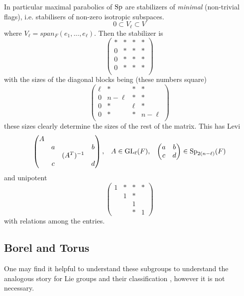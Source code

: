     \label{maximal_parabolic}
    In particular maximal parabolics of \(\operatorname{Sp}\) are stabilizers of \textit{minimal} (non-trivial flags), i.e. stabilisers of non-zero isotropic subspaces.
    \[0 \subset V_\ell \subset V\]
    where \(V_\ell = span_F(e_1, ..., e_\ell)\). Then the stabilizer is 
    \[\begin{pmatrix}
        * &*&*&* \\
        0 &*&*&* \\
        0 &*&*&* \\
        0 &*&*&* \\
    \end{pmatrix}\]
    with the sizes of the diagonal blocks being (these numbers square)
    \[\begin{pmatrix}
        \ell &*&*&* \\
        0 &n-\ell&*&* \\
        0 &*&\ell&* \\
        0 &*&*&n-\ell \\
    \end{pmatrix}\]
    these sizes clearly determine the sizes of the rest of the matrix. This has Levi
    \[\begin{pmatrix}
        A &&& \\
         &a&&b \\
         &&(A^T)^{-1}& \\
         &c&&d \\
    \end{pmatrix}, \;\;\; A\in \operatorname{GL}_\ell(F), \;\;\; \begin{pmatrix}
        a & b\\
        c & d \\
    \end{pmatrix} \in \operatorname{Sp}_{2(n-\ell)}(F)\]
    and unipotent 
    \[\begin{pmatrix}
        1 &*&*&* \\
        & 1&*& \\
        && 1& \\
        &&*&1
    \end{pmatrix}\]
    with relations among the entries.

    \subsection{Borel and Torus}
    One may find it helpful to understand these subgroups to understand the analogous story for Lie groups and their classification \cite{hallLieGroupsLie2015}, however it is not necessary. 


